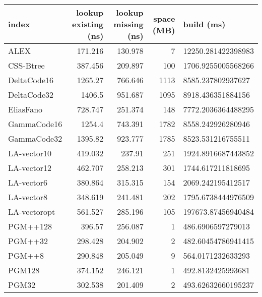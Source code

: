 \begin{tabular}{lrrrl}
\hline
 index             &   lookup existing (ns) &   lookup missing (ns) &   space (MB) & build (ms)         \\
\hline
 ALEX              &                171.216 &              130.978  &            7 & 12250.281422398983 \\
 CSS-Btree         &                387.456 &              209.897  &          100 & 1706.9255005568266 \\
 DeltaCode16       &               1265.27  &              766.646  &         1113 & 8585.237802937627  \\
 DeltaCode32       &               1406.5   &              951.687  &         1095 & 8918.436351884156  \\
 EliasFano         &                728.747 &              251.374  &          148 & 7772.2036364488295 \\
 GammaCode16       &               1254.4   &              743.391  &         1782 & 8558.242926280946  \\
 GammaCode32       &               1395.82  &              923.777  &         1785 & 8523.531216755511  \\
 LA-vector10       &                419.032 &              237.91   &          251 & 1924.8916687443852 \\
 LA-vector12       &                462.707 &              258.213  &          301 & 1744.617211818695  \\
 LA-vector6        &                380.864 &              315.315  &          154 & 2069.242195412517  \\
 LA-vector8        &                348.619 &              241.481  &          202 & 1795.6738444976509 \\
 LA-vectoropt      &                561.527 &              285.196  &          105 & 197673.87456940484 \\
 PGM++128          &                396.57  &              256.087  &            1 & 486.6906597279013  \\
 PGM++32           &                298.428 &              204.902  &            2 & 482.60454786941415 \\
 PGM++8            &                290.848 &              205.049  &            9 & 564.0171232633293  \\
 PGM128            &                374.152 &              246.121  &            1 & 492.8132425993681  \\
 PGM32             &                302.538 &              201.409  &            2 & 493.62632660195237 \\

\end{tabular}
